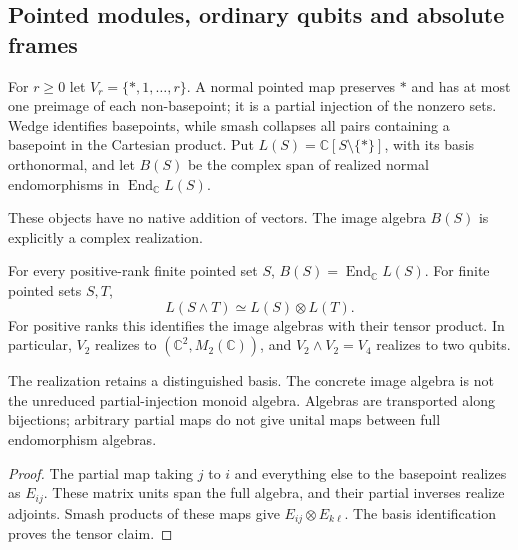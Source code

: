 \subsection{Pointed modules, ordinary qubits and absolute frames}

\begin{definition}
For $r\geq0$ let $V_r=\{*,1,\ldots,r\}$. A normal pointed map preserves
$*$ and has at most one preimage of each non-basepoint; it is a partial
injection of the nonzero sets. Wedge identifies basepoints, while smash
collapses all pairs containing a basepoint in the Cartesian product.
Put $L(S)=\mathbb C[S\setminus\{*\}]$, with its basis orthonormal, and
let $B(S)$ be the complex span of realized normal endomorphisms in
$\operatorname{End}_{\mathbb C}L(S)$.
\end{definition}
\begin{scope}These objects have no native addition of vectors. The image
algebra $B(S)$ is explicitly a complex realization.\end{scope}

\begin{proposition}
{\normalfont\statusSketch}\quad For every positive-rank finite pointed set $S$,
$B(S)=\operatorname{End}_{\mathbb C}L(S)$. For finite pointed sets $S,T$,
\[
L(S\wedge T)\simeq L(S)\otimes L(T).
\]
For positive ranks this identifies the image algebras with their tensor
product. In particular, $V_2$ realizes to $(\mathbb C^2,M_2(\mathbb C))$,
and $V_2\wedge V_2=V_4$ realizes to two qubits.
\end{proposition}
\begin{scope}The realization retains a distinguished basis. The concrete
image algebra is not the unreduced partial-injection monoid algebra.
Algebras are transported along bijections; arbitrary partial maps do not
give unital maps between full endomorphism algebras.\end{scope}
\begin{proof}
The partial map taking $j$ to $i$ and everything else to the basepoint
realizes as $E_{ij}$. These matrix units span the full algebra, and their
partial inverses realize adjoints. Smash products of these maps give
$E_{ij}\otimes E_{k\ell}$. The basis identification proves the tensor claim.
\end{proof}


